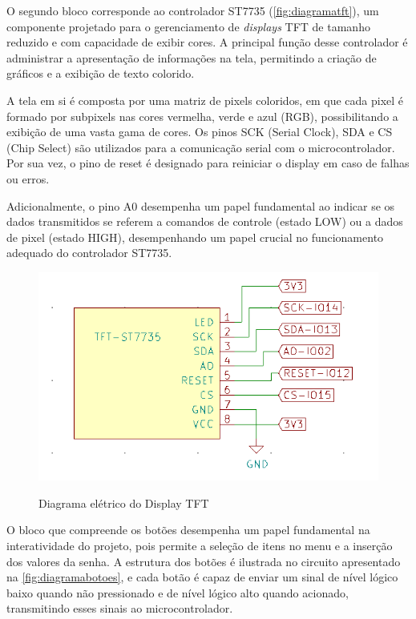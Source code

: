 O segundo bloco corresponde ao controlador ST7735 (\autoref{fig:diagramatft}), 
um componente projetado para o gerenciamento de \textit{displays} TFT de tamanho 
reduzido e com capacidade de exibir cores. A principal função desse 
controlador é administrar a apresentação de informações na tela, 
permitindo a criação de gráficos e a exibição de texto colorido.

A tela em si é composta por uma matriz de pixels coloridos, em que 
cada pixel é formado por subpixels nas cores vermelha, verde e azul 
(RGB), possibilitando a exibição de uma vasta gama de cores. Os pinos 
SCK (Serial Clock), SDA e CS (Chip Select) são utilizados para a 
comunicação serial com o microcontrolador. Por sua vez, o pino de 
reset é designado para reiniciar o display em caso de falhas ou erros.

Adicionalmente, o pino A0 desempenha um papel fundamental ao indicar 
se os dados transmitidos se referem a comandos de controle (estado LOW) 
ou a dados de pixel (estado HIGH), desempenhando um papel crucial no 
funcionamento adequado do controlador ST7735.

\begin{figure}[h!]
    \centering
    \caption{Diagrama elétrico do Display TFT}
    \includegraphics[scale=0.36]{figuras/modulo_tft.png}
    \fonte{}%
    \label{fig:diagramatft}
    \centering
\end{figure}

O bloco que compreende os botões desempenha um papel fundamental na 
interatividade do projeto, pois permite a seleção de itens no menu 
e a inserção dos valores da senha. A estrutura dos botões é 
ilustrada no circuito apresentado na \autoref{fig:diagramabotoes}, e 
cada botão é capaz de enviar um sinal de nível lógico baixo quando não 
pressionado e de nível lógico alto quando acionado, transmitindo esses 
sinais ao microcontrolador.

